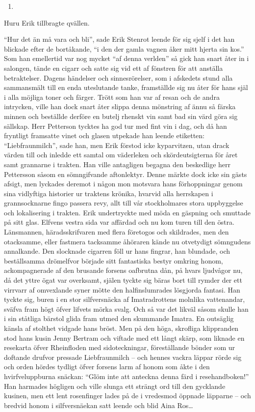 \begin{enumerate}
\def\labelenumi{\arabic{enumi}.}
\setcounter{enumi}{13}
\tightlist
\item
\end{enumerate}

Huru Erik tillbragte qvällen.

``Hur det än må vara och bli'', sade Erik Stenrot leende för sig sjelf i
det han blickade efter de bortåkande, ``i den der gamla vagnen åker mitt
hjerta sin kos.'' Som han emellertid var nog mycket ``af denna verlden''
så gick han snart åter in i salongen, tände en cigarr och satte sig vid
ett af fönstren för att anställa betraktelser. Dagens händelser och
sinnesrörelser, som i afskedets stund alla sammansmält till en enda
uteslutande tanke, framställde sig nu åter för hans själ i alla möjliga
toner och färger. Trött som han var af resan och de andra intrycken,
ville han dock snart åter slippa denna mönstring af ännu så färska
minnen och beställde derföre en butelj rhenskt vin samt bad sin värd
göra sig sällskap. Herr Petterson tycktes ha god tur med fint vin i dag,
och då han fryntligt framsatte vinet och glasen utpekade han leende
etiketten: ``Liebfraunmilch'', sade han, men Erik förstod icke
kyparvitzen, utan drack värden till och inledde ett samtal om väderleken
och skördeutsigterna för året samt grannarne i trakten. Han ville
antagligen begagna den beskedlige herr Pettersson såsom en sömngifvande
aftonlektyr. Denne märkte dock icke sin gästs afsigt, men lyckades
deremot i någon mon motsvara hans förhoppningar genom sina vidlyftiga
historier ur traktens krönika, hvarvid alla herrskapen i grannsocknarne
fingo passera revy, allt till vår stockholmares stora uppbyggelse och
lokalisering i trakten. Erik undertryckte med möda en gäspning och
smuttade på sitt glas. Elfvens vestra sida var affärdad och nu kom turen
till den östra. Länsmannen, häradsskrifvaren med flera företogos och
skildrades, men den otacksamme, eller fastmera tacksamme åhöraren kände
nu otvetydigt sömngudens annalkande. Den slocknade cigarren föll ur hans
fingrar, han blundade, och beställsamma drömelfvor började sitt
fantastiska bestyr omkring honom, ackompagnerade af den brusande forsens
oafbrutna dån, på hvars ljudvågor nu, då det yttre ögat var overksamt,
själen tyckte sig bäras bort till rymder der ett virrvarr af omvexlande
syner mötte den halfinslumrades lösgjorda fantasi. Han tyckte sig, buren
i en stor silfversnäcka af Imatradrottens molnlika vattenandar, sväfva
fram högt öfver lifvets mörka svalg. Och så var det likväl såsom skulle
han i sin ståtliga bärstol glida fram utmed den skummande Imatra. En
outsäglig känsla af stolthet vidgade hans bröst. Men på den höga,
skrofliga klippranden stod hans kusin Jenny Bertram och viftade med ett
långt skärp, som liknade en resekarta öfver Rheinfloden med
sidoteckningar, föreställande bönder som ur doftande drufvor pressade
Liebfraunmilch -- och hennes vackra läppar rörde sig och orden hördes
tydligt öfver forsens larm af honom som åkte i den hvirfveluppburna
snäckan: ``Glöm inte att anteckna denna färd i resehandboken!'' Han
harmades högligen och ville slunga ett strängt ord till den gycklande
kusinen, men ett lent rosenfinger lades på de i vredesmod öppnade
läpparne -- och bredvid honom i silfversnäekan satt leende och blid Aina
Ros\ldots{}

